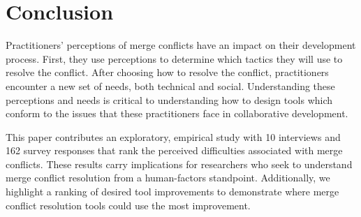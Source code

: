 \section{Conclusion}\label{conclusion}
Practitioners' perceptions of merge conflicts have an impact on their development process. First, they use perceptions to determine which tactics they will use to resolve the conflict.
After choosing how to resolve the conflict, practitioners encounter a new set of needs, both technical and social. 
Understanding these perceptions and needs is critical to understanding how to design tools which conform to the issues that these practitioners face in collaborative development.

This paper contributes an exploratory, empirical study with 10 interviews and 162 survey responses that rank the perceived difficulties associated with merge conflicts. These results carry implications for researchers who seek to understand merge conflict resolution from a human-factors standpoint.  Additionally, we highlight a ranking of desired tool improvements to demonstrate where merge conflict resolution tools could use the most improvement. 

%
%
